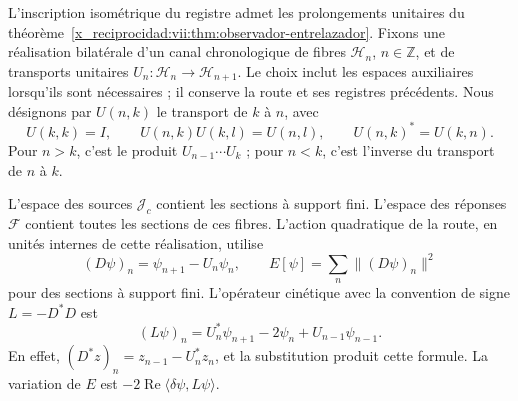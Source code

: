 L'inscription isométrique du registre admet les prolongements unitaires du théorème~\ref{x_reciprocidad:vii:thm:observador-entrelazador}. Fixons une réalisation bilatérale d'un canal chronologique de fibres \(\mathcal H_n\), \(n\in\mathbb Z\), et de transports unitaires \(U_n:\mathcal H_n\to\mathcal H_{n+1}\). Le choix inclut les espaces auxiliaires lorsqu'ils sont nécessaires ; il conserve la route et ses registres précédents. Nous désignons par \(U(n,k)\) le transport de \(k\) à \(n\), avec
\[
 U(k,k)=I,\qquad U(n,k)U(k,l)=U(n,l),\qquad
 U(n,k)^*=U(k,n).
\]
Pour \(n>k\), c'est le produit \(U_{n-1}\cdots U_k\) ; pour \(n<k\),
c'est l'inverse du transport de \(n\) à \(k\).

L'espace des sources \(\mathcal J_c\) contient les sections à support
fini. L'espace des réponses \(\mathcal F\) contient toutes les
sections de ces fibres. L'action quadratique de la route, en unités
internes de cette réalisation, utilise
\[
 (D\psi)_n=\psi_{n+1}-U_n\psi_n,\qquad
 E[\psi]=\sum_n\|(D\psi)_n\|^2
\]
pour des sections à support fini. L'opérateur cinétique avec la convention
de signe \(L=-D^*D\) est
\begin{equation}
 (L\psi)_n=U_n^*\psi_{n+1}-2\psi_n+U_{n-1}\psi_{n-1}.
 \label{x_reciprocidad:vii:eq:diferencia-covariante-bidireccional}
\end{equation}
En effet, \((D^*z)_n=z_{n-1}-U_n^*z_n\), et la substitution produit cette formule. La variation de \(E\) est \(-2\operatorname{Re}\langle\delta\psi,L\psi\rangle\).

